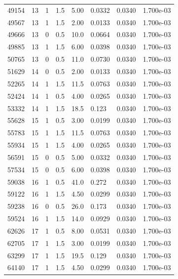 \documentclass[preview]{standalone}
\begin{document}
{{{\begin{tabular}{L{1.2cm}C{1.2cm} C{0.3cm}C{0.5cm} C{1.4cm}C{1.4cm} C{1.4cm}C{1.4cm}}
  49154  &    13  & 1     & 1.5 &  5.00  & 0.0332  & 0.0340 &  1.700e-03   \\ 
  49567  &    13  & 1     & 1.5 &  2.00  & 0.0133  & 0.0340 &  1.700e-03   \\ 
  49666  &    13  & 0     & 0.5 &  10.0  & 0.0664  & 0.0340 &  1.700e-03   \\ 
  49885  &    13  & 1     & 1.5 &  6.00  & 0.0398  & 0.0340 &  1.700e-03   \\ 
  50765  &    13  & 0     & 0.5 &  11.0  & 0.0730  & 0.0340 &  1.700e-03   \\ 
  51629  &    14  & 0     & 0.5 &  2.00  & 0.0133  & 0.0340 &  1.700e-03   \\ 
  52265  &    14  & 1     & 1.5 &  11.5  & 0.0763  & 0.0340 &  1.700e-03   \\ 
  52424  &    14  & 1     & 0.5 &  4.00  & 0.0265  & 0.0340 &  1.700e-03   \\ 
  53332  &    14  & 1     & 1.5 &  18.5  & 0.123  & 0.0340 &  1.700e-03   \\ 
  55628  &    15  & 1     & 0.5 &  3.00  & 0.0199  & 0.0340 &  1.700e-03   \\ 
  55783  &    15  & 1     & 1.5 &  11.5  & 0.0763  & 0.0340 &  1.700e-03   \\ 
  55934  &    15  & 1     & 1.5 &  4.00  & 0.0265  & 0.0340 &  1.700e-03   \\ 
  56591  &    15  & 0     & 0.5 &  5.00  & 0.0332  & 0.0340 &  1.700e-03   \\ 
  57534  &    15  & 0     & 0.5 &  6.00  & 0.0398  & 0.0340 &  1.700e-03   \\ 
  59038  &    16  & 1     & 0.5 &  41.0  & 0.272  & 0.0340 &  1.700e-03   \\ 
  59122  &    16  & 1     & 1.5 &  4.50  & 0.0299  & 0.0340 &  1.700e-03   \\ 
  59238  &    16  & 0     & 0.5 &  26.0  & 0.173  & 0.0340 &  1.700e-03   \\ 
  59524  &    16  & 1     & 1.5 &  14.0  & 0.0929  & 0.0340 &  1.700e-03   \\ 
  62626  &    17  & 1     & 0.5 &  8.00  & 0.0531  & 0.0340 &  1.700e-03   \\ 
  62705  &    17  & 1     & 1.5 &  3.00  & 0.0199  & 0.0340 &  1.700e-03   \\ 
  63299  &    17  & 1     & 1.5 &  19.5  & 0.129  & 0.0340 &  1.700e-03   \\ 
  64140  &    17  & 1     & 1.5 &  4.50  & 0.0299  & 0.0340 &  1.700e-03   \\ 

\end{tabular}}}}
\end{document}
